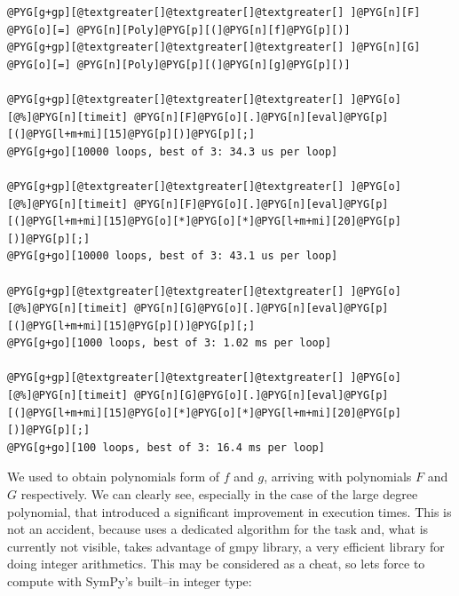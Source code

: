 \begin{Verbatim}[commandchars=@\[\]]
@PYG[g+gp][@textgreater[]@textgreater[]@textgreater[] ]@PYG[n][F] @PYG[o][=] @PYG[n][Poly]@PYG[p][(]@PYG[n][f]@PYG[p][)]
@PYG[g+gp][@textgreater[]@textgreater[]@textgreater[] ]@PYG[n][G] @PYG[o][=] @PYG[n][Poly]@PYG[p][(]@PYG[n][g]@PYG[p][)]

@PYG[g+gp][@textgreater[]@textgreater[]@textgreater[] ]@PYG[o][@%]@PYG[n][timeit] @PYG[n][F]@PYG[o][.]@PYG[n][eval]@PYG[p][(]@PYG[l+m+mi][15]@PYG[p][)]@PYG[p][;]
@PYG[g+go][10000 loops, best of 3: 34.3 us per loop]

@PYG[g+gp][@textgreater[]@textgreater[]@textgreater[] ]@PYG[o][@%]@PYG[n][timeit] @PYG[n][F]@PYG[o][.]@PYG[n][eval]@PYG[p][(]@PYG[l+m+mi][15]@PYG[o][*]@PYG[o][*]@PYG[l+m+mi][20]@PYG[p][)]@PYG[p][;]
@PYG[g+go][10000 loops, best of 3: 43.1 us per loop]

@PYG[g+gp][@textgreater[]@textgreater[]@textgreater[] ]@PYG[o][@%]@PYG[n][timeit] @PYG[n][G]@PYG[o][.]@PYG[n][eval]@PYG[p][(]@PYG[l+m+mi][15]@PYG[p][)]@PYG[p][;]
@PYG[g+go][1000 loops, best of 3: 1.02 ms per loop]

@PYG[g+gp][@textgreater[]@textgreater[]@textgreater[] ]@PYG[o][@%]@PYG[n][timeit] @PYG[n][G]@PYG[o][.]@PYG[n][eval]@PYG[p][(]@PYG[l+m+mi][15]@PYG[o][*]@PYG[o][*]@PYG[l+m+mi][20]@PYG[p][)]@PYG[p][;]
@PYG[g+go][100 loops, best of 3: 16.4 ms per loop]
\end{Verbatim}
\noindent
We used  to obtain polynomials form of $f$ and $g$, arriving with polynomials $F$
and $G$ respectively. We can clearly see, especially in the case of the large degree polynomial,
that \href{http://docs.python.org/library/functions.html\#eval}{} introduced a significant improvement in execution times. This is not an
accident, because \href{http://docs.python.org/library/functions.html\#eval}{} uses a dedicated algorithm for the task and, what is currently
not visible, takes advantage of gmpy library, a very efficient library for doing integer
arithmetics. This may be considered as a cheat, so lets force  to compute with
SymPy's built--in integer type:

